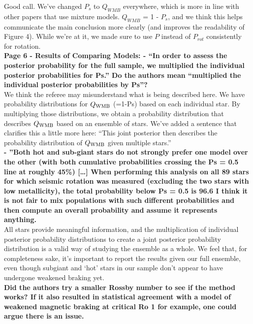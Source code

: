\documentclass[11pt]{article}
\begin{document}
Good call. We’ve changed $P_s$ to $Q_{WMB}$ everywhere, which is more in line with other papers that use mixture models. $Q_{WMB}$ = 1 - $P_s$, and we think this helps communicate the main conclusion more clearly (and improves the readability of Figure 4).  While we’re at it, we made sure to use $P$ instead of $P_{rot}$ consistently for rotation.\\

\noindent\textbf{Page 6 - Results of Comparing Models:
- “In order to assess the posterior probability for the full sample, we multiplied the individual posterior probabilities for Ps.” Do the authors mean “multiplied the individual posterior probabilities by Ps”?}\\

We think the referee may misunderstand what is being described here. We have probability distributions for $Q_{\rm WMB}$ (=1-Ps) based on each individual star. By multiplying those distributions, we obtain a probability distribution that describes $Q_{\rm WMB}$ based on an ensemble of stars. We’ve added a sentence that clarifies this a little more here: “This joint posterior then describes the probability distribution of $Q_{\rm WMB}$ given multiple stars.” \\

\noindent\textbf{- ”Both hot and sub-giant stars do not strongly prefer one model over the other (with both
cumulative probabilities crossing the Ps = 0.5 line at roughly 45\%) […] When performing
this analysis on all 89 stars for which seismic rotation was measured (excluding the
two stars with low metallicity), the total probability below Ps = 0.5 is 96.6%
I think it is not fair to mix populations with such different probabilities and then compute an overall probability and assume it represents anything.}\\

All stars provide meaningful information, and the multiplication of individual posterior probability distributions to create a joint posterior probability distribution is a valid way of studying the ensemble as a whole. We feel that, for completeness sake, it’s important to report the results given our full ensemble, even though subgiant and ‘hot’ stars in our sample don’t appear to have undergone weakened braking yet.\\

\noindent\textbf{Did the authors try a smaller Rossby number to see if the method works? If it also resulted in statistical agreement with a model of weakened magnetic braking at critical Ro 1 for example, one could argue there is an issue.}\\
\end{document}
